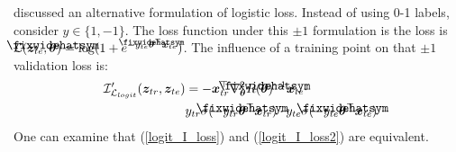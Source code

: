\documentclass{article}
\newcommand\lowerwidehatsym{%
  \text{\smash{\raisebox{-1.3ex}{%
    $\fixwidehatsym$}}}}
\newcommand\fixwidehat[1]{%
  \mathchoice
    {\accentset{\displaystyle\lowerwidehatsym}{#1}}
    {\accentset{\textstyle\lowerwidehatsym}{#1}}
    {\accentset{\scriptstyle\lowerwidehatsym}{#1}}
    {\accentset{\scriptscriptstyle\lowerwidehatsym}{#1}}
}
\begin{document}
\cite{koh2017} discussed an alternative formulation of logistic loss. Instead of using 0-1 labels, consider $y \in \{1,-1\}$. The loss function under this $\pm 1$ formulation is the loss is $\mathcal{L}(\bm{z}_{te}, \fixwidehat{\bm{\theta}}) = \log(1+e^{-y_{te}\fixwidehat{\bm{\theta}}^{\top} \bm{x}_{te}})$. The influence of a training point on that $\pm1$ validation loss is:
\begin{align}\label{logit_I_loss2}
\vspace{-0.15in}
\mathcal{I}'_{\mathcal{L}_{logit}}(\bm{z}_{tr}, \bm{z}_{te}) &= -\bm{x}_{tr}^{\top}\nabla_{\bm{\theta}}^2 R(\fixwidehat{\bm{\theta}})^{-1} \bm{x}_{te}\cdot\\
&y_{tr}\sigma(-y_{tr}\fixwidehat{\bm{\theta}}^{\top}\bm{x}_{tr})\cdot y_{te}\sigma(-y_{te}\fixwidehat{\bm{\theta}}^{\top}\bm{x}_{te})\notag
\vspace{-0.15in}
\end{align}
One can examine that (\ref{logit_I_loss}) and (\ref{logit_I_loss2}) are equivalent. 
\end{document}
